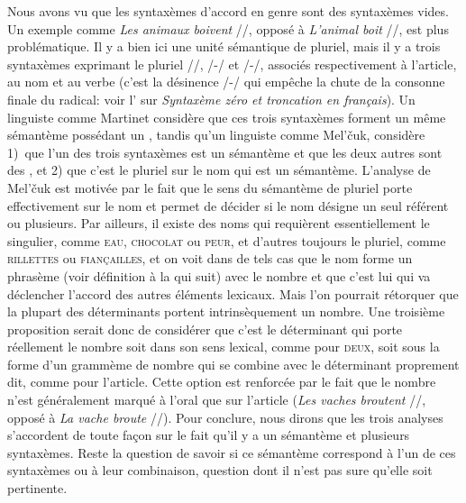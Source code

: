 {    Nous avons vu que les syntaxèmes d’accord en genre sont des syntaxèmes vides. Un exemple comme \textit{Les animaux boivent} //, opposé à \textit{L’animal boit} //, est plus problématique. Il y a bien ici une unité sémantique de pluriel, mais il y a trois syntaxèmes exprimant le pluriel //, /-/ et /-/, associés respectivement à l’article, au nom et au verbe (c'est la désinence /-/ qui empêche la chute de la consonne finale du radical: voir l’ sur \textit{Syntaxème zéro et troncation en français}). Un linguiste comme Martinet considère que ces trois syntaxèmes forment un même sémantème possédant un , tandis qu’un linguiste comme Mel’čuk, considère 1)~que l’un des trois syntaxèmes est un sémantème et que les deux autres sont des , et 2) que c’est le pluriel sur le nom qui est un sémantème. L'analyse de Mel’čuk est motivée par le fait que le sens du sémantème de pluriel porte effectivement sur le nom et permet de décider si le nom désigne un seul référent ou plusieurs. Par ailleurs, il existe des noms qui requièrent essentiellement le singulier, comme \textsc{eau}, \textsc{chocolat} ou \textsc{peur}, et d’autres toujours le pluriel, comme \textsc{rillettes} ou \textsc{fiançailles}, et on voit dans de tels cas que le nom forme un phrasème (voir définition à la  qui suit) avec le nombre et que c’est lui qui va déclencher l’accord des autres éléments lexicaux. Mais l’on pourrait rétorquer que la plupart des déterminants portent intrinsèquement un nombre. Une troisième proposition serait donc de considérer que c’est le déterminant qui porte réellement le nombre soit dans son sens lexical, comme pour \textsc{deux}, soit sous la forme d’un grammème de nombre qui se combine avec le déterminant proprement dit, comme pour l’article. Cette option est renforcée par le fait que le nombre n’est généralement marqué à l’oral que sur l’article (\textit{Les vaches broutent} //, opposé à \textit{La vache broute} //). Pour conclure, nous dirons que les trois analyses s’accordent de toute façon sur le fait qu’il y a un sémantème et plusieurs syntaxèmes. Reste la question de savoir si ce sémantème correspond à l’un de ces syntaxèmes ou à leur combinaison, question dont il n’est pas sure qu’elle soit pertinente.
}

